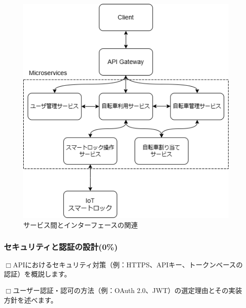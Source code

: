           \begin{figure}[htbp]
            \centering
            \includegraphics[scale=0.5]
            {figures/microservice-architecture.png}
            \caption{サービス間とインターフェースの関連}
            \label{fig:サービス間とインターフェースの関連}
          \end{figure}

      \subsubsection{セキュリティと認証の設計(0\%)}
        \label{sec:security_and_authentication_design}
          \par $\Box$APIにおけるセキュリティ対策（例：HTTPS、APIキー、トークンベースの認証）を概説します。
          \par $\Box$ユーザー認証・認可の方法（例：OAuth 2.0、JWT）の選定理由とその実装方針を述べます。
